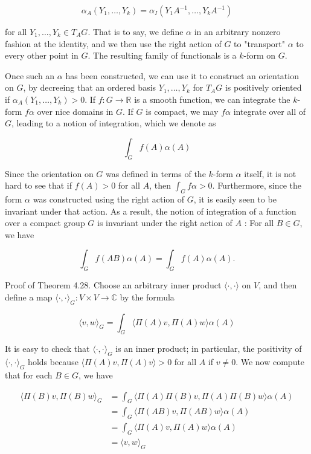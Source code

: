 \documentclass[10pt, letterpaper]{article}
\begin{document}
$$
\alpha_{A}\left(Y_{1}, \ldots, Y_{k}\right)=\alpha_{I}\left(Y_{1} A^{-1}, \ldots, Y_{k} A^{-1}\right)
$$

for all $Y_{1}, \ldots, Y_{k} \in T_{A} G$. That is to say, we define $\alpha$ in an arbitrary nonzero fashion at the identity, and we then use the right action of $G$ to "transport" $\alpha$ to every other point in $G$. The resulting family of functionals is a $k$-form on $G$.

Once such an $\alpha$ has been constructed, we can use it to construct an orientation on $G$, by decreeing that an ordered basis $Y_{1}, \ldots, Y_{k}$ for $T_{A} G$ is positively oriented if $\alpha_{A}\left(Y_{1}, \ldots, Y_{k}\right)>0$. If $f: G \rightarrow \mathbb{R}$ is a smooth function, we can integrate the $k$-form $f \alpha$ over nice domains in $G$. If $G$ is compact, we may $f \alpha$ integrate over all of $G$, leading to a notion of integration, which we denote as

$$
\int_{G} f(A) \alpha(A)
$$

Since the orientation on $G$ was defined in terms of the $k$-form $\alpha$ itself, it is not hard to see that if $f(A)>0$ for all $A$, then $\int_{G} f \alpha>0$. Furthermore, since the form $\alpha$ was constructed using the right action of $G$, it is easily seen to be invariant under that action. As a result, the notion of integration of a function over a compact group $G$ is invariant under the right action of $A$ : For all $B \in G$, we have

$$
\int_{G} f(A B) \alpha(A)=\int_{G} f(A) \alpha(A) .
$$

Proof of Theorem 4.28. Choose an arbitrary inner product $\langle\cdot, \cdot\rangle$ on $V$, and then define a map $\langle\cdot, \cdot\rangle_{G}: V \times V \rightarrow \mathbb{C}$ by the formula

$$
\langle v, w\rangle_{G}=\int_{G}\langle\Pi(A) v, \Pi(A) w\rangle \alpha(A)
$$

It is easy to check that $\langle\cdot, \cdot\rangle_{G}$ is an inner product; in particular, the positivity of $\langle\cdot, \cdot\rangle_{G}$ holds because $\langle\Pi(A) v, \Pi(A) v\rangle>0$ for all $A$ if $v \neq 0$. We now compute that for each $B \in G$, we have

$$
\begin{aligned}
\langle\Pi(B) v, \Pi(B) w\rangle_{G} & =\int_{G}\langle\Pi(A) \Pi(B) v, \Pi(A) \Pi(B) w\rangle \alpha(A) \\
& =\int_{G}\langle\Pi(A B) v, \Pi(A B) w\rangle \alpha(A) \\
& =\int_{G}\langle\Pi(A) v, \Pi(A) w\rangle \alpha(A) \\
& =\langle v, w\rangle_{G}
\end{aligned}
$$
\end{document}
